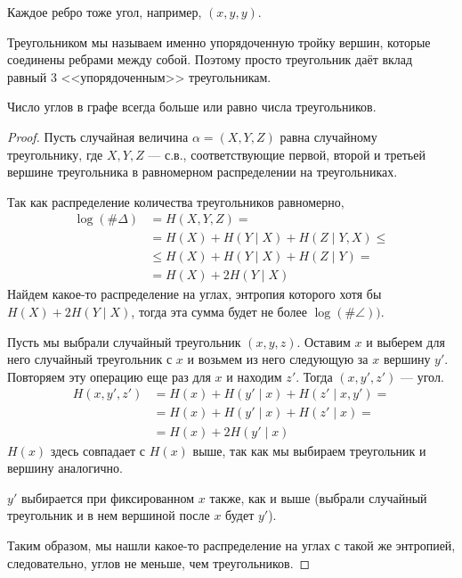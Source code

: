 \begin{note}
	Каждое ребро тоже угол, например, $ (x, y, y)$.
\end{note}
\begin{note}
    Треугольником мы называем именно упорядоченную тройку вершин, которые соединены ребрами между собой. Поэтому просто треугольник даёт вклад равный 3 <<упорядоченным>> треугольникам.
\end{note}
\begin{thm}
    Число углов в графе всегда больше или равно числа треугольников.
\end{thm}
\begin{proof}
 	Пусть случайная величина $ \alpha = (X, Y, Z)$ равна случайному треугольнику, где $ X, Y, Z$ --- с.в., соответствующие первой, второй и третьей вершине треугольника в равномерном распределении на треугольниках. 

	Так как распределение количества треугольников равномерно,
	\begin{align*}
		\log (\# \Delta)& = H(X, Y, Z)  = \\
					  &= H(X) + H(Y \mid  X) + H(Z \mid  Y, X) \le \tag{Chain rule}  \\
					  & \le  H(X) + H(Y \mid X) + H(Z \mid Y) = \tag{циклический сдвиг в треугольнике} \\
		 & = H(X) + 2 H(Y \mid X)
	\end{align*}
Найдем какое-то распределение на углах, энтропия которого хотя бы $ H(X) + 2H(Y \mid X)$, тогда эта сумма будет не более  $  \log (\# \angle)) $.

	Пусть мы выбрали случайный треугольник $ (x, y, z)$. Оставим $ x$ и выберем для него случайный треугольник с $ x$ и возьмем из него следующую за $ x$ вершину $ y'$. Повторяем эту операцию еще раз для $ x$ и находим  $ z'$. Тогда $ (x,  y', z')$ --- угол.
	\begin{align*}
		H(x, y', z') & = H(x) + H(y' \mid x) + H(z' \mid x, y') = \tag{Так как $ y'$ и  $ z'$ независимы при выбранном  $ x$}  \\
					 & =H(x) + H(y'\mid x) + H(z' \mid x) = \tag{Выбор аналогичный} \\
					 & = H(x) + 2 H(y' \mid x)
	\end{align*}
	$ H(x)$ здесь совпадает с  $ H(x) $ выше, так как мы выбираем треугольник и вершину аналогично.

	$ y'$ выбирается при фиксированном  $ x$ также, как и выше (выбрали случайный треугольник и в нем вершиной после $ x$ будет  $ y'$).

	Таким образом, мы нашли какое-то распределение на углах с такой же энтропией, следовательно, углов не меньше, чем треугольников.
\end{proof}



